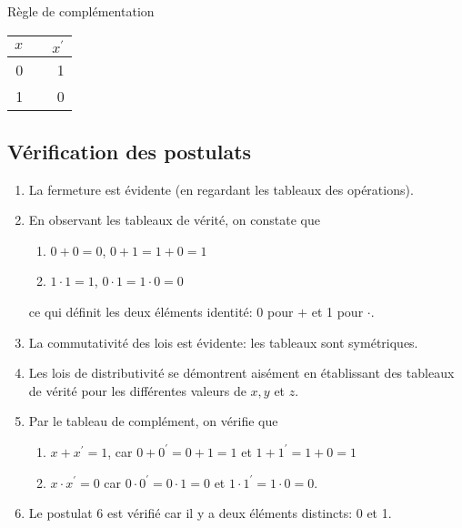 \documentclass[11pt]{article}
\begin{document}
Règle de complémentation

\begin{center}
\begin{tabular}{rlr}
\(x\) &  & \(x^{\prime}\)\\[0pt]
\hline
0 &  & 1\\[0pt]
1 &  & 0\\[0pt]
\end{tabular}
\end{center}


\subsection{Vérification des postulats}
\label{sec:org3fbfadb}

\begin{enumerate}
\item La fermeture est évidente (en regardant les tableaux des opérations).

\item En observant les tableaux de vérité, on constate que

\begin{enumerate}
\item \(0 + 0 = 0\), \(0 + 1 = 1 + 0 = 1\)

\item \(1 \cdot 1 = 1\), \(0 \cdot 1 = 1 \cdot 0 = 0\)
\end{enumerate}

ce qui définit les deux éléments identité: 0 pour \(+\) et 1 pour  \(\cdot\).

\item La commutativité des lois est évidente: les tableaux sont
symétriques.

\item Les lois de distributivité se démontrent aisément en établissant des
tableaux de vérité pour les différentes valeurs de \(x, y\) et \(z\).

\item Par le tableau de complément, on vérifie que

\begin{enumerate}
\item \(x + x^{\prime} = 1\), car \(0 + 0^{\prime} = 0 + 1 = 1\) et \(1 +
        1^{\prime} = 1+ 0 = 1\)

\item \(x \cdot x^{\prime} = 0\) car \(0 \cdot 0^{\prime} = 0 \cdot 1 =
        0\) et \(1 \cdot 1^{\prime} = 1 \cdot 0 = 0\).
\end{enumerate}

\item Le postulat 6 est vérifié car il y a deux éléments distincts: 0 et 1.
\end{enumerate}
\end{document}
